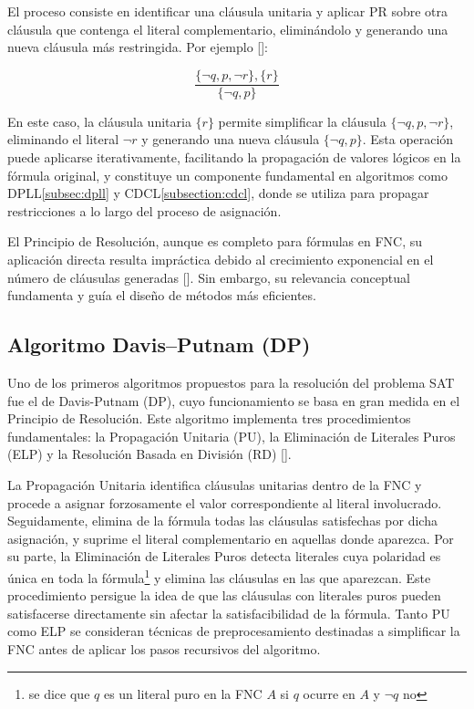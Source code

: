 El proceso consiste en identificar una cl\'ausula unitaria y aplicar PR sobre otra cl\'ausula que contenga el literal complementario, elimin\'andolo y generando una nueva cl\'ausula m\'as restringida. Por ejemplo [\cite{garcia-satcap}]:

\begin{equation*}
\dfrac{\{\neg q, p, \neg r\},\{r\}}{\{\neg q, p\}}
\end{equation*}

En este caso, la cl\'{a}usula unitaria \( \{r\} \) permite simplificar la cl\'{a}usula \( \{\neg q, p, \neg r\} \), eliminando el literal \( \neg r \) y generando una nueva cl\'{a}usula \( \{\neg q, p\} \). Esta operaci\'{o}n puede aplicarse iterativamente, facilitando la propagaci\'{o}n de valores l\'{o}gicos en la f\'{o}rmula original, y constituye un componente fundamental en algoritmos como DPLL\ref{subsec:dpll} y CDCL\ref{subsection:cdcl}, donde se utiliza para propagar restricciones a lo largo del proceso de asignaci\'{o}n.

El Principio de Resoluci\'on, aunque es completo para fórmulas en FNC, su aplicación directa resulta impráctica debido al crecimiento exponencial en el número de cláusulas generadas [\cite{garcia-satcap}]. Sin embargo, su relevancia conceptual fundamenta y guía el diseño de métodos más eficientes.


\subsection{Algoritmo Davis–Putnam (DP)}
\label{subsec:davis-putnam}
Uno de los primeros algoritmos propuestos para la resolución del problema SAT fue el de Davis-Putnam (DP), cuyo funcionamiento se basa en gran medida en el Principio de Resolución. Este algoritmo implementa tres procedimientos fundamentales: la Propagación Unitaria (PU), la Eliminación de Literales Puros (ELP) y la Resolución Basada en División (RD) [\cite{garcia-satcap}].

La Propagaci\'on Unitaria identifica cláusulas unitarias dentro de la FNC y procede a asignar forzosamente el valor correspondiente al literal involucrado. Seguidamente, elimina de la fórmula todas las cláusulas satisfechas por dicha asignación, y suprime el literal complementario en aquellas donde aparezca. Por su parte, la Eliminaci\'on de Literales Puros detecta literales cuya polaridad es única en toda la fórmula\footnote{se dice que $q$ es un literal puro en la FNC $A$ si $q$ ocurre en $A$ y $\neg q$ no} y elimina las cláusulas en las que aparezcan. Este procedimiento persigue la idea de que las cl\'ausulas con literales puros pueden satisfacerse directamente sin afectar la satisfacibilidad de la fórmula. Tanto PU como ELP se consideran técnicas de preprocesamiento destinadas a simplificar la FNC antes de aplicar los pasos recursivos del algoritmo.

